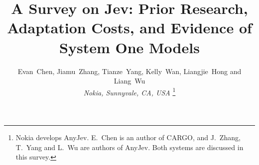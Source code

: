 \documentclass[journal]{IEEEtran}
\begin{document}
\title{A Survey on Jev: Prior Research, Adaptation Costs, and Evidence of System One Models}

\author{Evan~Chen, Jiamu~Zhang, Tianze~Yang, Kelly~Wan, Liangjie~Hong and Liang~Wu\\
\textit{Nokia, Sunnyvale, CA, USA}%
\thanks{Nokia develops AnyJev. E.~Chen is an author of CARGO, and J.~Zhang, T.~Yang and L.~Wu are authors of AnyJev. Both systems are discussed in this survey.}%
}


\maketitle













\end{document}
